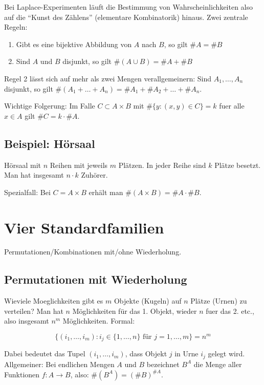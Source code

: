 Bei Laplace-Experimenten läuft die Bestimmung von Wahrscheinlichkeiten also
auf die ``Kunst des Zählens'' (elementare Kombinatorik) hinaus. Zwei zentrale
Regeln:

\begin{enumerate}
\item Gibt es eine bijektive Abbildung von $A$ nach $B$, so gilt $\#A = \#B$
\item Sind $A$ und $B$ disjunkt, so gilt $\#(A \cup B) = \#A + \#B$
\end{enumerate}

Regel 2 lässt sich auf mehr als zwei Mengen verallgemeinern: Sind
$A_1,\ldots,A_n$ disjunkt, so gilt $\#(A_1 + \ldots + A_n) = \#A_1 + \#A_2 +
\ldots + \#A_n$.

Wichtige Folgerung: Im Falle $C \subset A \times B$ mit $\#\{ y : (x,y) \in C
\} = k$ fuer alle $x \in A$ gilt $\#C = k \cdot \#A$.


\subsection{Beispiel: Hörsaal}

Hörsaal mit $n$ Reihen mit jeweils $m$ Plätzen. In jeder Reihe sind $k$
Plätze besetzt. Man hat insgesamt $n \cdot k$ Zuhörer.

Spezialfall: Bei $C = A \times B$ erhält man $\#(A \times B) = \#A \cdot \#B$.


\section{Vier Standardfamilien}

Permutationen/Kombinationen mit/ohne Wiederholung.

\subsection{Permutationen mit Wiederholung}

Wieviele Moeglichkeiten gibt es $m$ Objekte (Kugeln) auf $n$ Plätze (Urnen)
zu verteilen? Man hat $n$ Möglichkeiten für das 1. Objekt, wieder $n$ fuer
das 2. etc., also insgesamt $n^m$ Möglichkeiten. Formal:

\[ \{ (i_1,\ldots,i_m) : i_j \in \{ 1,\ldots,n \} \text{ für } j = 1,\ldots,m
\} = n^m \]

Dabei bedeutet das Tupel $(i_1,\ldots,i_m)$, dass Objekt $j$ in Urne $i_j$
gelegt wird. Allgemeiner: Bei endlichen Mengen $A$ und $B$ bezeichnet $B^A$
die Menge aller Funktionen $f: A \to B$, also: $\#(B^A) = (\#B)^{\#A}$.


